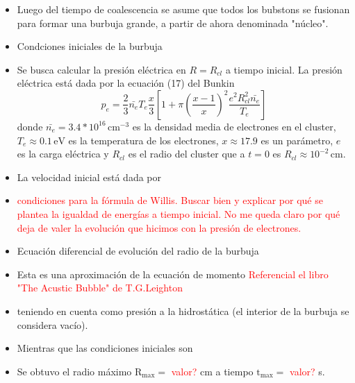 \documentclass[aps,prb,twocolumn,superscriptaddress,floatfix,longbibliography,10pt]{revtex4-2}
\newcounter{para}
\begin{document}
\begin{itemize}
  \item Luego del tiempo de coalescencia se asume que todos los bubstons se fusionan para formar una burbuja grande, a partir de ahora denominada "núcleo".
  \item Condciones iniciales de la burbuja
  \item Se busca calcular la presión eléctrica en $R = R_{cl}$ a tiempo inicial. La presión eléctrica está dada por la ecuación (17) del Bunkin
  \[p_{e} = \frac{2}{3}\bar{n_e} T_e \frac{x}{3} \left [1 + \pi \left ( \frac{x-1}{x} \right )^2 \frac{e^2R_{cl}^2\bar{n_e}}{T_e}   \right ] \]
  donde $\bar{n_e} = 3.4 *10^{16} \, \mathrm{cm}^{-3}$ es la densidad media de electrones en el cluster, $T_e \approx 0.1 \, \mathrm{eV}$ es la temperatura de los electrones, $x \approx 17.9$ es un parámetro, $e$ es la carga eléctrica y $R_{cl}$ es el radio del cluster que a $t=0$ es $R_{cl} \approx 10^{-2} \, \mathrm{cm}$.  
  \item La velocidad inicial está dada por 
  \item \textcolor{red}{condiciones para la fórmula de Willis. Buscar bien y explicar por qué se plantea la igualdad de energías a tiempo inicial. No me queda claro por qué deja de valer la evolución que hicimos con la presión de electrones.}
  \item Ecuación diferencial de evolución del radio de la burbuja
  \item Esta es una aproximación de la ecuación de momento \textcolor{red}{Referencial el libro "The Acustic Bubble" de T.G.Leighton}
  \item teniendo en cuenta como presión a la hidrostática (el interior de la burbuja se considera vacío).
  \item Mientras que las condiciones iniciales son 
  \item Se obtuvo el radio máximo $\mathrm{R_{max}} = $ \textcolor{red}{valor?} cm a tiempo $\mathrm{t_{max}} = $ \textcolor{red}{valor?} s.
\end{itemize}
\end{document}
